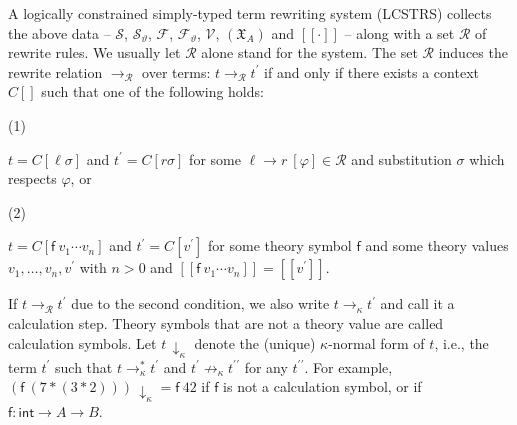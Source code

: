 \documentclass[10pt,a4paper]{amsart}
\begin{document}
 
 
A logically constrained simply-typed term rewriting system (LCSTRS) collects the above data – $\mathcal{S}$, ${\mathcal{S}}_{\vartheta}$, $\mathcal{F}$, ${\mathcal{F}}_{\vartheta}$, $\mathcal{V}$, $(\mathfrak{X}_{A})$ and $[\![\cdot]\!]$ – along with a set $\mathcal{R}$ of rewrite rules. We usually let $\mathcal{R}$ alone stand for the system. The set $\mathcal{R}$ induces the rewrite relation $\rightarrow_{\mathcal{R}}$ over terms: $t\rightarrow_{\mathcal{R}}t^{\prime}$ if and only if there exists a context ${C}[]$ such that one of the following holds:\par
  
\par\noindent  (1) 
 
$t={C}[\ell\sigma]$ and $t^{\prime}={C}[r\sigma]$ for some ${\ell}\rightarrow{r}\ [\varphi]\in\mathcal{R}$ and substitution $\sigma$ which respects $\varphi$, or\par
 
 
 
\par\noindent  (2) 
 
$t={C}[{\mathsf{f}}\ {{v}_{1}\cdots{v}_{n}}]$ and $t^{\prime}={C}[v^{\prime}]$ for some theory symbol $\mathsf{f}$ and some theory values ${v}_{1},\ldots,{v}_{n},v^{\prime}$ with $n>0$ and $[\![{\mathsf{f}}\ {{v}_{1}\cdots{v}_{n}}]\!]=[\![v^{\prime}]\!]$.\par
 
 
  
 
 
If $t\rightarrow_{\mathcal{R}}t^{\prime}$ due to the second condition, we also write $t\rightarrow_{\kappa}t^{\prime}$ and call it a calculation step. Theory symbols that are not a theory value are called calculation symbols. Let $t\,{\downarrow}_{\kappa}$ denote the (unique) $\kappa$-normal form of $t$, i.e., the term $t^{\prime}$ such that $t\rightarrow_{\kappa}^{*}t^{\prime}$ and $t^{\prime}\not\rightarrow_{\kappa}t^{\prime\prime}$ for any $t^{\prime\prime}$. For example, $({\mathsf{f}}\ {(7*(3*2))})\,{\downarrow}_{\kappa}={\mathsf{f}}\ {42}$ if $\mathsf{f}$ is not a calculation symbol, or if $\mathsf{f}:\mathsf{int}\rightarrow A\rightarrow B$.\par
 
\end{document}
